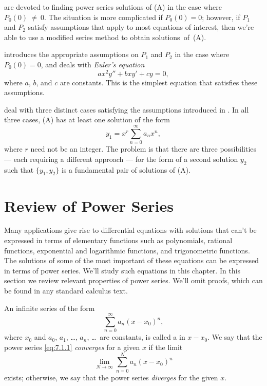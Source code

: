 \medskip\noindent
{}
 are devoted
to finding power series solutions of (A) in the case where
$P_0(0)~\ne~0$.
The situation is  more complicated if $P_0(0)=0$;   however,
 if $P_1$ and $P_2$ satisfy assumptions that
 apply to most equations of interest,
then we're  able to use a modified series method
to obtain solutions~of~(A).

\medskip\noindent
{} introduces the appropriate assumptions on $P_1$
and $P_2$
in the case where $P_0(0)=0$, and deals with \emph{\color{blue}Euler's equation}
\[
ax^2y''+bxy'+cy=0,
\]
where $a$, $b$, and $c$ are constants. This  is the simplest
equation that satisfies these  assumptions.



\medskip\noindent
{} deal
 with three distinct cases satisfying the
assumptions introduced in . In all three cases,
(A) has at least one solution of the form
\[
y_1=x^r\sum_{n=0}^\infty a_nx^n,
\]
where $r$ need not be an integer. The problem is that there are three
possibilities --- each requiring a different approach --- for the
form of a second solution $y_2$ such that
$\{y_1,y_2\}$ is a
fundamental pair of solutions of (A).

\newpage

\section{Review of Power Series}\label{sec:review_power_series}

Many applications give rise to differential equations with solutions
that can't be expressed in terms of elementary functions such as
polynomials, rational functions, exponential and logarithmic
functions, and trigonometric functions. The solutions of some of the
most important of these equations can be expressed in terms of power
series. We'll study such equations in this chapter. In this section
we review relevant properties of power series. We'll omit proofs,
which can be found in any standard calculus text.

\begin{definition}\label{thmtype:7.1.1}
An infinite series of the form
\begin{equation} \label{eq:7.1.1}
\sum_{n=0}^\infty a_n(x-x_0)^n,
\end{equation}
where $x_0$ and $a_0$, $a_1$, \dots, $a_n$, \dots\ are constants, is
called a
 in $x-x_0$. We say that the power series
\eqref{eq:7.1.1} \emph{\color{blue}converges} for a given $x$ if the limit
\[
\lim_{N\to\infty}
\sum_{n=0}^Na_n(x-x_0)^n
\]
exists; otherwise, we say that the power series \emph{\color{blue}diverges}
for the given $x$.
\end{definition}

